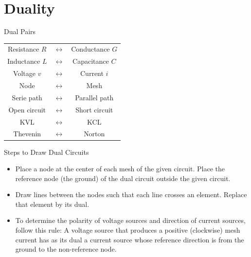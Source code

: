 \documentclass{beamer}
\begin{document}


    



\section{Duality}
\begin{frame}{Dual Pairs}
\begin{table}[]
    \centering
    \setlength{\tabcolsep}{7mm}
    \begin{tabular}{ccc}
         Resistance $R$ &$\longleftrightarrow$& Conductance $G$ \\
         Inductance $L$&$\longleftrightarrow$& Capacitance $C$ \\
         Voltage $v$ &$\longleftrightarrow$& Current $i$ \\
         Node &$\longleftrightarrow$& Mesh \\
         Serie path &$\longleftrightarrow$& Parallel path \\
         Open circuit &$\longleftrightarrow$& Short circuit \\
         KVL &$\longleftrightarrow$& KCL \\
         Thevenin &$\longleftrightarrow$& Norton \\
    \end{tabular}
\end{table}
\end{frame}


\begin{frame}{Steps to Draw Dual Circuits}

    \begin{itemize}
        \item Place a node at the center of each mesh of the given circuit. Place the reference node (the ground) of the dual circuit outside the given circuit.
        \item Draw lines between the nodes such that each line crosses an element. Replace that element by its dual.
        \item To determine the polarity of voltage sources and direction of current sources, follow this rule: A voltage source that produces a positive (clockwise) mesh current has as its dual a current source whose reference direction is from the ground to the non-reference node.
    \end{itemize}
\end{frame}
\end{document}
